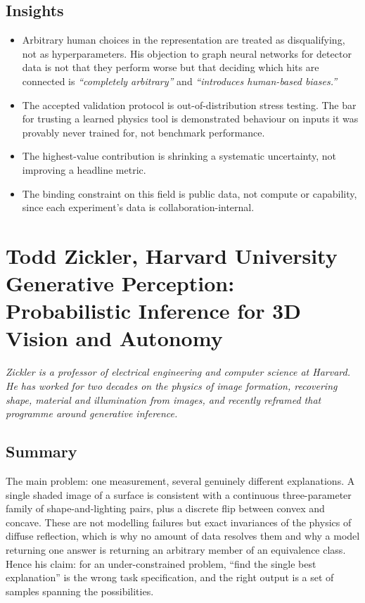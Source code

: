 \documentclass[11pt]{article}
\begin{document}
\subsection*{Insights}
\begin{itemize}
    \item Arbitrary human choices in the representation are treated as disqualifying, not as hyperparameters. His objection to graph neural networks for detector data is not that they perform worse but that deciding which hits are connected is \emph{``completely arbitrary''} and \emph{``introduces human-based biases.''}
    \item The accepted validation protocol is out-of-distribution stress testing. The bar for trusting a learned physics tool is demonstrated behaviour on inputs it was provably never trained for, not benchmark performance.
    \item The highest-value contribution is shrinking a systematic uncertainty, not improving a headline metric.
    \item The binding constraint on this field is public data, not compute or capability, since each experiment's data is collaboration-internal.
\end{itemize}

\section{Todd Zickler, Harvard University\\
{\large Generative Perception: Probabilistic Inference for 3D Vision and Autonomy}}

\emph{Zickler is a professor of electrical engineering and computer science at Harvard. He has worked for two decades on the physics of image formation, recovering shape, material and illumination from images, and recently reframed that programme around generative inference.}

\subsection*{Summary}
The main problem: one measurement, several genuinely different explanations. A single shaded image of a surface is consistent with a continuous three-parameter family of shape-and-lighting pairs, plus a discrete flip between convex and concave. These are not modelling failures but exact invariances of the physics of diffuse reflection, which is why no amount of data resolves them and why a model returning one answer is returning an arbitrary member of an equivalence class. Hence his claim: for an under-constrained problem, ``find the single best explanation'' is the wrong task specification, and the right output is a set of samples spanning the possibilities.
\end{document}
